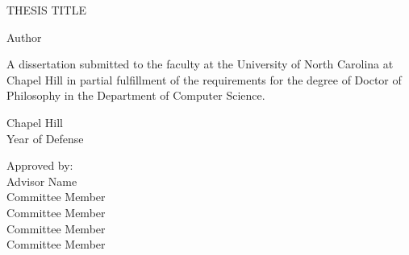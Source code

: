 \begin{titlepage}
\begin{center}


\vspace{2in}
\begin{singlespace}
    \MakeUppercase{Thesis Title}\\ %
\end{singlespace}


\vspace{61pt} %
Author
\end{center}



\vspace{39pt}
\begin{singlespace}
\noindent
\begin{center}
A dissertation submitted to the faculty at the University of North Carolina at Chapel Hill
in partial fulfillment of the requirements for the degree of Doctor of Philosophy in
the Department of Computer Science.
\end{center}
\end{singlespace}


\vspace{39pt}
\begin{center}
\begin{singlespace}
Chapel Hill\\
Year of Defense
\end{singlespace}
\end{center}


\vspace{39pt}
\begin{flushright}
\begin{minipage}[t]{1.8333 in}
Approved by:\\
Advisor Name\\
Committee Member\\
Committee Member\\
Committee Member\\
Committee Member\\
\end{minipage}
\end{flushright}

\end{titlepage}
